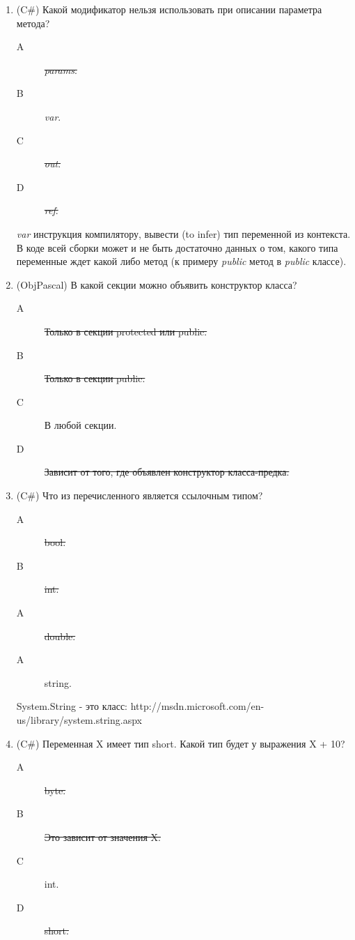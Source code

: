 \documentclass[12pt]{article}
\begin{document}
\begin{enumerate}
		\item (C\#) Какой модификатор нельзя использовать при описании параметра метода? 
			\begin{description}
				\item[A] \sout{\emph{params}.}
				\item[B] \emph{var}.
				\item[C] \sout{\emph{out}.}
				\item[D] \sout{\emph{ref}.}
			\end{description}
			\emph{var} инструкция компилятору, вывести (to infer) тип переменной из контекста.
			\\
			В коде всей сборки может и не быть достаточно данных о том, какого типа переменные ждет какой либо метод (к примеру \emph{public} метод в \emph{public} классе).


		\item (ObjPascal) В какой секции можно объявить конструктор класса? 
			\begin{description}
				\item[A] \sout{Только в секции protected или public.}
				\item[B] \sout{Только в секции public.}
				\item[C] В любой секции.
				\item[D] \sout{Зависит от того, где объявлен конструктор класса-предка.}
			\end{description}


		\item (C\#) Что из перечисленного является ссылочным типом?
			\begin{description}
				\item[A] \sout{bool.}
				\item[B] \sout{int.}
				\item[A] \sout{double.}
				\item[A] string.
			\end{description}

			System.String - это класс: http://msdn.microsoft.com/en-us/library/system.string.aspx

		\item (C\#)  Переменная X имеет тип short. Какой тип будет у выражения X + 10? 
			\begin{description}
				\item[A] \sout{byte.}
				\item[B] \sout{Это зависит от значения X.} 
				\item[C] int.
				\item[D] \sout{short.}
			\end{description}


\end{enumerate}
\end{document}

